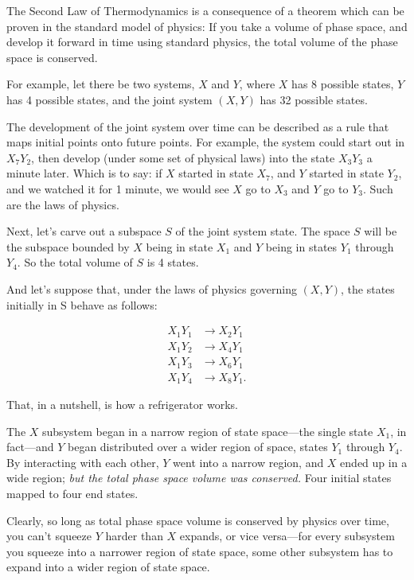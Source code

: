 {
 The Second Law of Thermodynamics is a consequence of a theorem
which can be proven in the standard model of physics: If you take a
volume of phase space, and develop it forward in time using standard
physics, the total volume of the phase space is conserved.}

{
 For example, let there be two systems, $X$ and $Y$, where $X$ has 8
possible states, $Y$ has 4 possible states, and the joint system $(X,Y)$
has 32 possible states.}

{
 The development of the joint system over time can be described as
a rule that maps initial points onto future points. For example, the
system could start out in $X_{7}Y_{2}$, then
develop (under some set of physical laws) into the state
$X_{3}Y_{3}$ a minute later. Which is to say:
if $X$ started in state $X_{7}$, and $Y$ started in state
$Y_{2}$, and we watched it for 1 minute, we would see $X$ go
to $X_{3}$ and $Y$ go to $Y_{3}$. Such are the laws
of physics.}

{
 Next, let's carve out a subspace $S$ of the joint
system state. The space $S$ will be the subspace bounded by $X$ being in
state $X_{1}$ and $Y$ being in states $Y_{1}$
through $Y_{4}$. So the total volume of $S$ is 4 states.}

{
 And let's suppose that, under the laws of physics
governing $(X,Y)$, the states initially in S behave as follows:}


\begin{align*}
 X_{1}Y_{1} &\rightarrow X_{2}Y_{1} \\
 X_{1}Y_{2} &\rightarrow X_{4}Y_{1} \\
 X_{1}Y_{3} &\rightarrow X_{6}Y_{1} \\
 X_{1}Y_{4} &\rightarrow X_{8}Y_{1}.
\end{align*}

{
 That, in a nutshell, is how a refrigerator works.}

{
 The $X$ subsystem began in a narrow region of state space---the
single state $X_{1}$, in fact---and $Y$ began distributed over
a wider region of space, states $Y_{1}$ through
$Y_{4}$. By interacting with each other, $Y$ went into a
narrow region, and $X$ ended up in a wide region; \textit{but the total
phase space volume was conserved.} Four initial states mapped to four
end states.}

{
 Clearly, so long as total phase space volume is conserved by
physics over time, you can't squeeze $Y$ harder than $X$
expands, or vice versa---for every subsystem you squeeze into a
narrower region of state space, some other subsystem has to expand into
a wider region of state space.}

